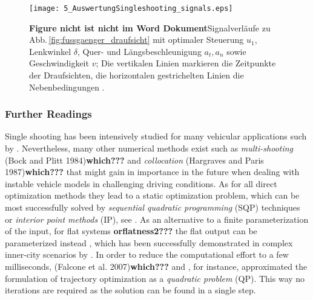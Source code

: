 \begin{figure}	
\centering
	\def\xlabel{$t$ in $\unit{s}$}
	\def\ylabelA{$v$ in $\unitfrac{m}{s}$}	
	\def\ylabelB{$\delta$ in $\unit{rad}$}	
	\def\ylabelC{$u_1$ in $\unitfrac{rad}{s}$}
	\def\ylabelD{$a_t$ in $\unitfrac{m}{s^2}$}	
	\def\ylabelE{$a_n$ in $\unitfrac{m}{s^2}$}
	
	\renewcommand{\matlabtextA}{\normalsize }
  \texttt{[image: 5\_AuswertungSingleshooting\_signals.eps]}
    \caption[Signalverläufe bei kombiniertem Bremsen und Ausweichen]{\textbf{Figure nicht ist nicht im Word Dokument}Signalverläufe zu Abb.\,\ref{fig:fussgaenger_draufsicht} mit optimaler Steuerung $u_1$, Lenkwinkel $\delta$,  Quer- und Längsbeschleunigung $a_t, a_n$ sowie Geschwindigkeit $v$; Die vertikalen Linien markieren die Zeitpunkte der Draufsichten, die horizontalen gestrichelten Linien die Nebenbedingungen \cite{werling2012cdc}.}
    \label{fig:fussgaenger_draufsicht_signale}
\end{figure}

\subsubsection{Further Readings}\label{S:57.3.2.3}

Single shooting has been intensively studied for many vehicular applications such by \cite{kelly2003reactive,falcone2007linear,howard2007optimal,Yoon2009,gerdts2009generating, park2009obstacle}.%
Nevertheless, many other numerical methods exist such as \emph{multi-shooting} (Bock and Plitt 1984)\textbf{which???} and \emph{collocation} (Hargraves and Paris 1987)\textbf{which???} that might gain in importance in the future when dealing with instable vehicle models in challenging driving conditions. 
As for all direct optimization methods they lead to a static optimization problem, which can be most successfully solved by \emph{sequential quadratic programming} (SQP) techniques or \emph{interior point methods} (IP), see \cite{nocedal2006numerical}.%
As an alternative to a finite parameterization of the input, for flat systems \cite{rouchon1993flatness1}\textbf{orflatness2???}%
the flat output can be parameterized instead \cite{kang2012online},%
 which has been successfully demonstrated in complex inner-city scenarios by \cite{ziegler2014trajectory}. %
In order to reduce the computational effort to a few milliseconds, (Falcone et al. 2007)\textbf{which???} and \cite{carvalho2013predictive},%
for instance, approximated the formulation of trajectory optimization as a \emph{quadratic problem} (QP). This way no iterations are required as the solution can be found in a single step.

